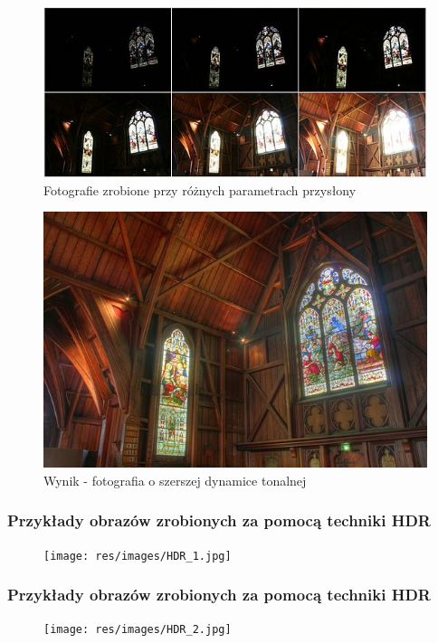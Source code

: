 \documentclass{beamer}
\begin{document}
\begin{frame}
	\begin{figure}
		\includegraphics[height=.2\textheight]{res/images/HDRSources.jpg}
		\caption{Fotografie zrobione przy różnych parametrach przysłony}
	\end{figure}
	\begin{figure}
		\includegraphics[height=.5\textheight]{res/images/HDRResult.jpg}
		\caption{Wynik - fotografia o szerszej dynamice tonalnej}
	\end{figure}
\end{frame}

\begin{frame}
	\frametitle{Przykłady obrazów zrobionych za pomocą techniki HDR}
	\begin{figure}
		\texttt{[image: res/images/HDR\_1.jpg]}
	\end{figure}
\end{frame}

\begin{frame}
	\frametitle{Przykłady obrazów zrobionych za pomocą techniki HDR}
	\begin{figure}
		\texttt{[image: res/images/HDR\_2.jpg]}
	\end{figure}
\end{frame}
\end{document}
